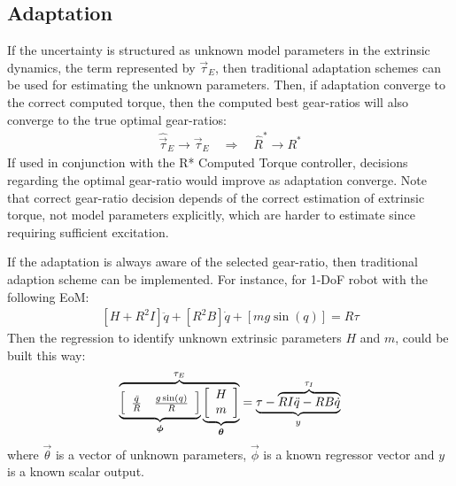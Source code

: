 \subsection{Adaptation}
If the uncertainty is structured as unknown model parameters in the extrinsic dynamics, the term represented by $\vec{\tau}_E$, then traditional adaptation schemes can be used for estimating the unknown parameters. Then, if adaptation converge to the correct computed torque, then the computed best gear-ratios will also converge to the true optimal gear-ratios:
%
\begin{align}
	\hat{\vec{\tau}}_E \rightarrow \vec{\tau}_E 
    \quad \Rightarrow \quad 
    \hat{R}^* \rightarrow R^*
 \label{eq:adapt}
\end{align}
%
If used in conjunction with the R* Computed Torque controller, decisions regarding the optimal gear-ratio would improve as adaptation converge. Note that correct gear-ratio decision depends of the correct estimation of extrinsic torque, not model parameters explicitly, which are harder to estimate since requiring sufficient excitation. 

If the adaptation is always aware of the selected gear-ratio, then traditional adaption scheme can be implemented. For instance, for 1-DoF robot with the following EoM:
%
\begin{align}
	\left[ H + R^2 I \right] \ddot{q} + \left[ R^2 B \right] \dot{q} + \left[ mg \sin( q ) \right] = R \tau
\end{align}
%
Then the regression to identify unknown extrinsic parameters $H$ and $m$, could be built this way:
%
%
\begin{align}
	\overbrace{
	\underbrace{ \left[
	\begin{array}{c c}
		\frac{\ddot{q}}{R} &  \frac{ g \sin( q ) }{R}
	\end{array} \right] }_{\vec{\phi}}
	\underbrace{ \left[
	\begin{array}{c}
		H \\ m 
	\end{array} \right] }_{\vec{\theta}}
	}^{\tau_E} = \underbrace{ \tau -  \overbrace{ R I \ddot{q} -  R B \dot{q} }^{\tau_I} }_{y}
\end{align}
%
where $\vec{\theta}$ is a vector of unknown parameters, $\vec{\phi}$ is a known regressor vector and $y$ is a known scalar output. 

